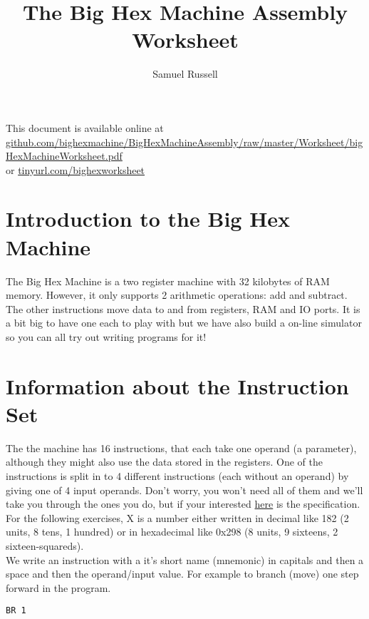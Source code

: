 \documentclass[10pt,a4paper]{article}
\author{Samuel Russell}
\title{The Big Hex Machine Assembly Worksheet}
\begin{document}
\maketitle

This document is available online at\\ \href{http://github.com/bighexmachine/BigHexMachineAssembly/raw/master/Worksheet/bigHexMachineWorksheet.pdf}{github.com/bighexmachine/BigHexMachineAssembly/raw/master/Worksheet/bigHexMachineWorksheet.pdf}\\or \href{http://tinyurl.com/bighexworksheet}{tinyurl.com/bighexworksheet}

\section{Introduction to the Big Hex Machine}
The Big Hex Machine is a two register machine with 32 kilobytes of RAM memory. However, it only supports 2 arithmetic operations: add and subtract. The other instructions move data to and from registers, RAM and IO ports. It is a bit big to have one each to play with but we have also build a on-line simulator so you can all try out writing programs for it!

\section{Information about the Instruction Set}
The the machine has 16 instructions, that each take one operand (a parameter), although they might also use the data stored in the registers. One of the instructions is split in to 4 different instructions (each without an operand) by giving one of 4 input operands. Don't worry, you won't need all of them and we'll take you through the ones you do, but if your interested \href{https://bighexmachine.github.io/BigHexOnlineSimulator/assemblySpec.pdf}{here} is the specification.\\

For the following exercises, X is a number either written in decimal like 182 (2 units, 8 tens, 1 hundred) or in hexadecimal like 0x298 (8 units, 9 sixteens, 2 sixteen-squareds).\\

We write an instruction with a it's short name (mnemonic) in capitals and then a space and then the operand/input value. For example to branch (move) one step forward in the program.
\begin{lstlisting}[frame=single]
BR 1
\end{lstlisting}
\end{document}
